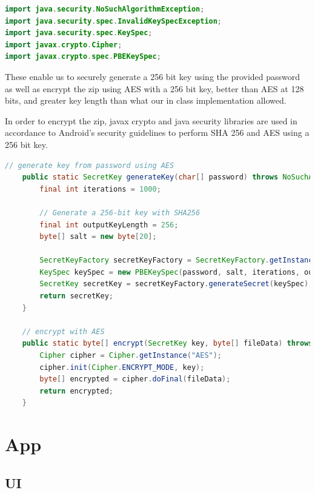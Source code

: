\documentclass[10pt,a4paper]{article}
\begin{document}
\begin{lstlisting}[language=Java]
import java.security.NoSuchAlgorithmException;
import java.security.spec.InvalidKeySpecException;
import java.security.spec.KeySpec;
import javax.crypto.Cipher;
import javax.crypto.spec.PBEKeySpec;
\end{lstlisting}

These enable us to securely generate a 256 bit key using the provided password as well as encrypt the zip using AES with a 256 bit key, better than AES at 128 bits, and greater key length than what our in class implementation allowed.

In order to encrypt the zip, javax crypto and java security libraries are used in accordance to Android's security guidelines to perform SHA 256 and AES using a 256 bit key.

\clearpage

\begin{lstlisting}[language=Java]
// generate key from password using AES
    public static SecretKey generateKey(char[] password) throws NoSuchAlgorithmException, InvalidKeySpecException {
        final int iterations = 1000;

        // Generate a 256-bit key with SHA256
        final int outputKeyLength = 256;
        byte[] salt = new byte[20];

        SecretKeyFactory secretKeyFactory = SecretKeyFactory.getInstance("PBKDF2withHmacSHA256");
        KeySpec keySpec = new PBEKeySpec(password, salt, iterations, outputKeyLength);
        SecretKey secretKey = secretKeyFactory.generateSecret(keySpec);
        return secretKey;
    }

    // encrypt with AES
    public static byte[] encrypt(SecretKey key, byte[] fileData) throws Exception {
        Cipher cipher = Cipher.getInstance("AES");
        cipher.init(Cipher.ENCRYPT_MODE, key);
        byte[] encrypted = cipher.doFinal(fileData);
        return encrypted;
    }

\end{lstlisting}

\clearpage

\section{App}

\subsection{UI}
\end{document}
